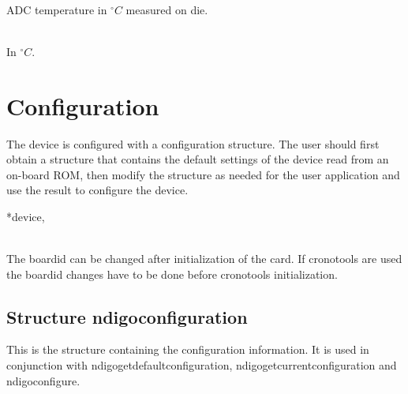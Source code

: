             \\
            ADC temperature in $^{\circ}C$ measured on die.\par

            \\
            In $^{\circ}C$.

    \section{Configuration}

        The device is configured with a configuration structure. The user should first obtain a structure that contains the default settings of the device read from an on-board ROM, then modify the structure as needed for the user application and use the result to configure the device.\par

        \newline {}\par

        \newline {}\par

         {*device,} \par

         \\
        The \textsf{board\tu id} can be changed after initialization of the card. If cronotools are used the \textsf{board\tu id} changes have to be done before cronotools initialization.

        \subsection{Structure ndigo\tu configuration}

            This is the structure containing the configuration information. It is used in conjunction with \textsf{ndigo\tu get\tu default\tu configuration}, \textsf{ndigo\tu get\tu current\tu configuration} and \textsf{ndigo\tu configure}.\par

